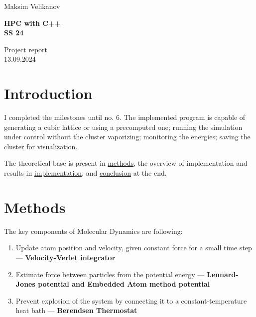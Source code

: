 \documentclass[12pt,a4paper]{article}
\title{}
\author{}
\begin{document}
\parbox{0.333\textwidth}{
	Maksim Velikanov \\[0mm]
}
\parbox{0.333\textwidth}{\vspace*{1mm}\begin{center}\large\bf%
		HPC with C++\\[0mm]
		SS 24\\[0mm]
\end{center}}
\parbox{0.333\textwidth}{
	\begin{flushright}
		Project report\\[0mm]
		13.09.2024\\[0mm]
	\end{flushright}
}
\par\vspace{-5mm}
\vspace*{2mm}
\raisebox{1.19cm}{%
	\textcolor{freiburg-gray}{\rule{\textwidth}{1.1mm}}}

\bigskip




\section{Introduction}

I completed the milestones until no. 6. The implemented program is capable of generating a cubic lattice or using a precomputed one; running the simulation under control without the cluster vaporizing; monitoring the energies; saving the cluster for visualization.

The theoretical base is present in \hyperref[methods]{methods}, the overview of implementation and results in \hyperref[implementation]{implementation}, and \hyperref[conclusion]{conclusion} at the end.

\section{Methods}
\label{methods}

The key components of Molecular Dynamics are following:

\begin{enumerate}
	\item Update atom position and velocity, given constant force for a small time step --- {\bf Velocity-Verlet integrator}
	\item Estimate force between particles from the potential energy --- {\bf Lennard-Jones potential and Embedded Atom method potential}
	\item Prevent explosion of the system by connecting it to a constant-temperature heat bath --- {\bf Berendsen Thermostat}
\end{enumerate}
\end{document}
